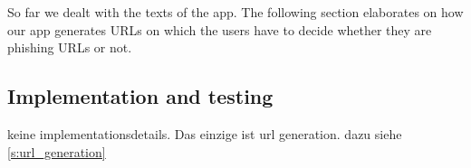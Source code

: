 So far we dealt with the texts of the app. 
The following section elaborates on how our app generates URLs on which the users have to decide whether they are phishing URLs or not.

\subsection{Implementation and testing}

keine implementationsdetails. Das einzige ist url generation. dazu siehe \ref{s:url_generation}